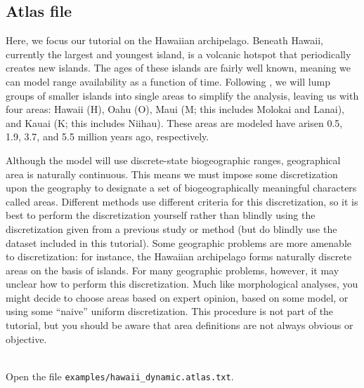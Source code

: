 \subsection{Atlas file}

Here, we focus our tutorial on the Hawaiian archipelago.
Beneath Hawaii, currently the largest and youngest island, is a volcanic hotspot that periodically creates new islands.
The ages of these islands are fairly well known, meaning we can model range availability as a function of time.
Following \citet{ree08}, we will lump groups of smaller islands into single areas to simplify the analysis, leaving us with four areas: Hawaii (H), Oahu (O), Maui (M; this includes Molokai and Lanai), and Kauai (K; this includes Niihau).
These areas are modeled have arisen 0.5, 1.9, 3.7, and 5.5 million years ago, respectively.

Although the model will use discrete-state biogeographic ranges, geographical area is naturally continuous.
This means we must impose some discretization upon the geography to designate a set of biogeographically meaningful characters called areas.
Different methods use different criteria for this discretization, so it is best to perform the discretization yourself rather than blindly using the discretization given from a previous study or method (but do blindly use the dataset included in this tutorial).
Some geographic problems are more amenable to discretization: for instance, the Hawaiian archipelago forms naturally discrete areas on the basis of islands.
For many geographic problems, however, it may unclear how to perform this discretization.
Much like morphological analyses, you might decide to choose areas based on expert opinion, based on some model, or using some ``naive'' uniform discretization.
This procedure is not part of the tutorial, but you should be aware that area definitions are not always obvious or objective.

\noindent \\ \impmark  Open the file \texttt{examples/hawaii\_dynamic.atlas.txt}.

